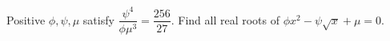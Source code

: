 Positive $\phi,\psi,\mu$ satisfy $\dfrac{\psi^4}{\phi\mu^3}=\dfrac{256}{27}$. Find all real roots of $\phi x^2-\psi\sqrt x+\mu=0$.
